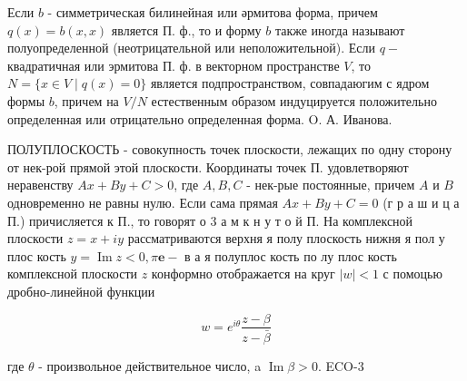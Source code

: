 \documentclass[10pt]{article}
\begin{document}
Если $b$ - симметрическая билинейная или әрмитова форма, причем $q(x)=b(x, x)$ является П. ф., то и форму $b$ также иногда называют полуопределенной (неотрицательной или неположительной). Если $q-$ квадратичная или эрмитова П. ф. в векторном пространстве $V$, то $N=\{x \in V \mid q(x)=0\}$ является подпространством, совпадаюгим с ядром формы $b$, причем на $V / N$ естественным образом индуцируется положительно определенная или отрицательно определенная форма. O. А. Иванова.



ПОЛУПЛОСКОСТЬ - совокупность точек плоскости, лежащих по одну сторону от нек-рой прямой этой плоскости. Координаты точек П. удовлетворяют неравенству $A x+B y+C>0$, где $A, B, C$ - нек-рые постоянные, причем $A$ и $B$ одновременно не равны нулю. Если сама прямая $A x+B y+C=0$ (г р а ш и ц а П.) причисляется к П., то говорят о 3 а м к н у т о й П. На комплексной плоскости $z=x+i y$ рассматриваются верхня я полу плоскость нижня я пол у плос кость $y=\operatorname{Im} z<0, \pi \mathbf{e}-$ в а я полуплос кость по лу плос кость комплексной плоскости $z$ конформно отображается на круг $|w|<1$ с помоцью дробно-линейной функции



\[

w=e^{i \theta} \frac{z-\beta}{z-\bar{\beta}}

\]



где $\theta$ - произвольное действительное число, a $\operatorname{Im} \beta>0$. ECO-3
\end{document}

